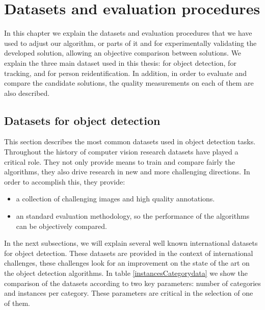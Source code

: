 \chapter{Datasets and evaluation procedures}\label{cap.dataset}


In this chapter we explain the datasets and evaluation procedures that we have used to adjust our algorithm, or parts of it and for experimentally validating the developed solution, allowing an objective comparison between solutions. We explain the three main dataset used in this thesis: for object detection, for tracking, and for person reidentification. In addition, in order to evaluate and compare the candidate solutions, the quality measurements on each of them are also described.


\section{Datasets for object detection}



This section describes the most common datasets used in object detection tasks. Throughout the history of computer vision research datasets have played a critical role.  They not only provide means to train and compare fairly the algorithms, they also drive research in new and more challenging directions. In order to accomplish this, they provide:


\begin{itemize}

\item a collection of challenging images and high quality annotations.

\item an standard evaluation methodology, so the performance of the algorithms can be objectively compared. 


\end{itemize}



In the next subsections, we will explain several well known international datasets for object detection. These datasets are provided in the context of international challenges, these challenges look for an improvement on the state of the art on the object detection algorithms. In table \ref{instancesCategorydata} we show the comparison of the datasets according to two key parameters: number of categories and instances per category. These parameters are critical in the selection of one of them.



